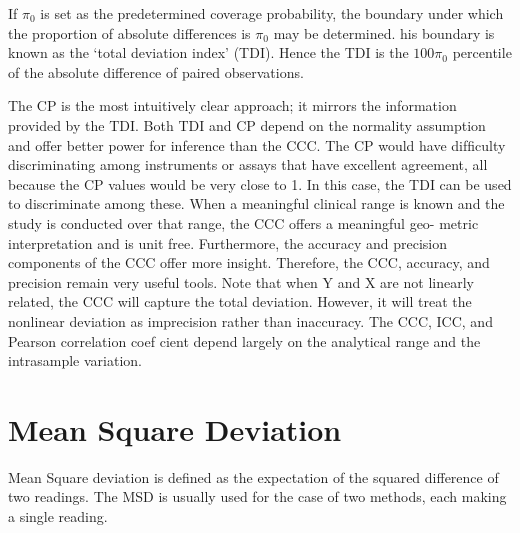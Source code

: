 If $\pi_{0}$ is set as the predetermined coverage probability, the
boundary under which the proportion of absolute differences is
$\pi_{0}$ may be determined. his boundary is known as the `total
deviation index' (TDI). Hence the TDI is the $100\pi_{0}$
percentile of the absolute difference of paired observations.


The CP is the most intuitively clear approach; it mirrors the information provided by the TDI. 
Both TDI and CP depend on the normality assumption and offer better power
for inference than the CCC. The CP would have difficulty discriminating among instruments or 
assays that have excellent agreement, all because the CP values would be very close to
1. In this case, the TDI can be used to discriminate among these. When a meaningful clinical range is known and the study is conducted over that range, the CCC offers a meaningful geo- metric interpretation and is unit free. Furthermore, the accuracy and precision components of the CCC offer more insight. Therefore, the CCC, accuracy, and precision remain very useful tools. Note that when Y and X are not linearly related, the CCC will capture the total deviation. However, it will treat the nonlinear deviation as imprecision rather than inaccuracy. The CCC, ICC, and Pearson correlation coef cient depend
largely on the analytical range and the intrasample variation.

\section{Mean Square Deviation}
Mean Square deviation is defined as the expectation of the squared difference of two readings.
The MSD is usually used for the case of two methods, each making a single reading.






